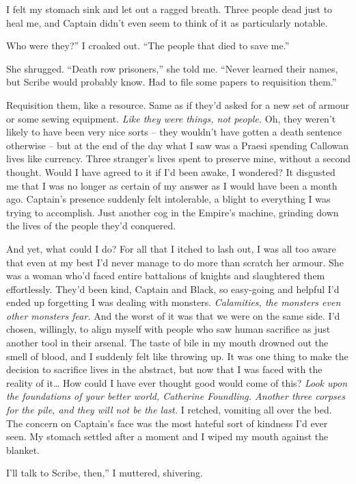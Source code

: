 \documentclass[12pt, openany]{book}
\begin{document}
I felt my stomach sink and let out a ragged breath. Three people dead just to heal me, and Captain didn’t even seem to think of it as particularly notable. 

Who were they?” I croaked out. “The people that died to save me.”

She shrugged. “Death row prisoners,” she told me. “Never learned their names, but Scribe would probably know. Had to file some papers to requisition them.”

Requisition them, like a resource. Same as if they’d asked for a new set of armour or some sewing equipment. \textit{Like they were things, not people.} Oh, they weren’t likely to have been very nice sorts – they wouldn’t have gotten a death sentence otherwise – but at the end of the day what I saw was a Praesi spending Callowan lives like currency. Three stranger’s lives spent to preserve mine, without a second thought. Would I have agreed to it if I’d been awake, I wondered? It disgusted me that I was no longer as certain of my answer as I would have been a month ago. Captain’s presence suddenly felt intolerable, a blight to everything I was trying to accomplish. Just another cog in the Empire’s machine, grinding down the lives of the people they’d conquered. 

And yet, what could I do? For all that I itched to lash out, I was all too aware that even at my best I’d never manage to do more than scratch her armour. She was a woman who’d faced entire battalions of knights and slaughtered them effortlessly. They’d been kind, Captain and Black, so easy-going and helpful I’d ended up forgetting I was dealing with monsters. \textit{Calamities, the monsters even other monsters fear.} And the worst of it was that we were on the same side. I’d chosen, willingly, to align myself with people who saw human sacrifice as just another tool in their arsenal. The taste of bile in my mouth drowned out the smell of blood, and I suddenly felt like throwing up. It was one thing to make the decision to sacrifice lives in the abstract, but now that I was faced with the reality of it… How could I have ever thought good would come of this? \textit{Look upon the foundations of your better world, Catherine Foundling. Another three corpses for the pile, and they will not be the last.} I retched, vomiting all over the bed. The concern on Captain’s face was the most hateful sort of kindness I’d ever seen. My stomach settled after a moment and I wiped my mouth against the blanket.

I’ll talk to Scribe, then,” I muttered, shivering.
\end{document}
